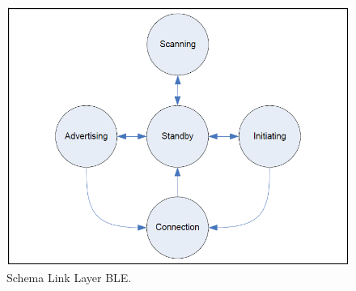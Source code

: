 \begin{figure}[t]
	\centering
	\includegraphics[width=0.9\linewidth, keepaspectratio]{Images/bt/bt_fsa}
	\caption[Schema Link Layer]{Schema Link Layer BLE\cite{BT-CoreSpec4.0}.}
	\label{fig:bt_fsa}
\end{figure}
